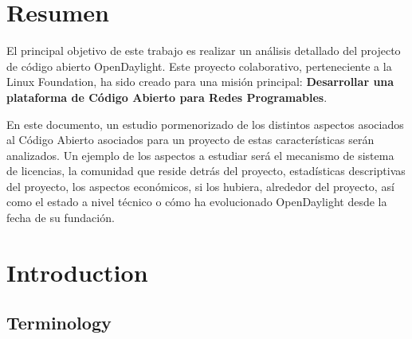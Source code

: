 \documentclass[a4paper, 12pt]{book}
\begin{document}
\chapter*{Resumen}
\label{chap:resumen}

El principal objetivo de este trabajo es realizar un análisis detallado del projecto de código abierto OpenDaylight. Este proyecto colaborativo, perteneciente a la Linux Foundation, ha sido creado para una misión principal: \textbf{Desarrollar una plataforma de Código Abierto para Redes Programables}.

En este documento, un estudio pormenorizado de los distintos aspectos asociados al Código Abierto asociados para un proyecto de estas características serán analizados. Un ejemplo de los aspectos a estudiar será el mecanismo de sistema de licencias, la comunidad que reside detrás del proyecto, estadísticas descriptivas del proyecto, los aspectos económicos, si los hubiera, alrededor del proyecto, así como el estado a nivel técnico o cómo ha evolucionado OpenDaylight desde la fecha de su fundación.


\chapter{Introduction}
\label{chap:introduction}

\section{Terminology}
\label{sec:terminology}
\end{document}
